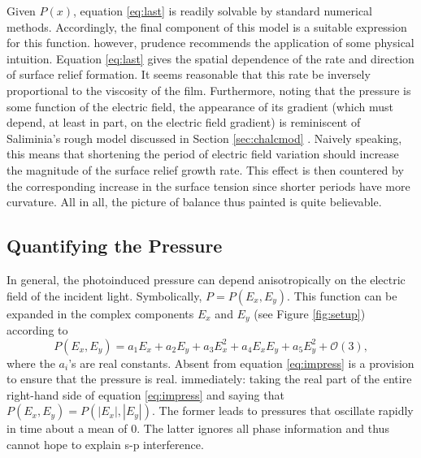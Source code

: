 \documentclass[twocolumn,showpacs,preprintnumbers,amsmath,amssymb]{revtex4}
\begin{document}
Given $P(x)$, equation \ref{eq:last} is readily solvable by standard numerical methods.
Accordingly, the final component of this model is a suitable expression for this
function. %
however, prudence recommends the application of some physical intuition. Equation
\ref{eq:last} gives the spatial dependence of the rate and direction of surface relief
formation. It seems reasonable that this rate be inversely proportional to the viscosity
of the film. Furthermore, noting that the pressure is some function of the electric
field, the appearance of its gradient (which must depend, at least in part, on the
electric field gradient) is reminiscent of Saliminia's rough model discussed in Section
\ref{sec:chalcmod} \cite{saliminia}. Naively speaking, this means that shortening the
period of electric field variation should increase the magnitude of the surface relief
growth rate. This effect is then countered by the corresponding increase in the surface
tension since shorter periods have more curvature. All in all, the picture of balance
thus painted is quite believable.

\subsection{Quantifying the Pressure}
\label{sec:presquant}


In general, the photoinduced pressure can depend anisotropically on the electric field of
the incident light. Symbolically, $P=P(E_x,E_y)$. This function can be expanded in the
complex components $E_x$ and $E_y$ (see Figure \ref{fig:setup}) according to
\begin{equation}
P(E_x,E_y)=a_1E_x+a_2E_y+a_3E_x^2+a_4E_xE_y+a_5E_y^2+\mathcal{O}(3) \mathrm{,}
\label{eq:impress}
\end{equation}
where the $a_i$'s are real constants. Absent from equation \ref{eq:impress} is a
provision to ensure that the pressure is real. %
immediately: taking the real part of the entire right-hand side of equation
\ref{eq:impress} and saying that $P(E_x,E_y)=P(|E_x|,|E_y|)$. The former leads to
pressures that oscillate rapidly in time about a mean of 0. The latter ignores all phase
information and thus cannot hope to explain s-p interference.
\end{document}
